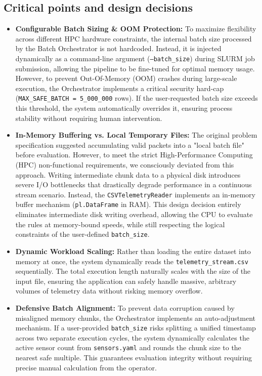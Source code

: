 \documentclass[11pt, a4paper]{article}
\begin{document}
\subsection{Critical points and design decisions}
\begin{itemize}
    \item \textbf{Configurable Batch Sizing \& OOM Protection:} To maximize flexibility across different HPC hardware constraints, the internal batch size processed by the Batch Orchestrator is not hardcoded. Instead, it is injected dynamically as a command-line argument (\texttt{--batch\_size}) during SLURM job submission, allowing the pipeline to be fine-tuned for optimal memory usage. However, to prevent Out-Of-Memory (OOM) crashes during large-scale execution, the Orchestrator implements a critical security hard-cap (\texttt{MAX\_SAFE\_BATCH = 5\_000\_000} rows). If the user-requested batch size exceeds this threshold, the system automatically overrides it, ensuring process stability without requiring human intervention.

    \item \textbf{In-Memory Buffering vs. Local Temporary Files:}
    The original problem specification suggested accumulating valid packets into a "local batch file" before evaluation. However, to meet the strict High-Performance Computing (HPC) non-functional requirements, we consciously deviated from this approach. Writing intermediate chunk data to a physical disk introduces severe I/O bottlenecks that drastically degrade performance in a continuous stream scenario. Instead, the \texttt{CSVTelemetryReader} implements an in-memory buffer mechanism (\texttt{pl.DataFrame} in RAM). This design decision entirely eliminates intermediate disk writing overhead, allowing the CPU to evaluate the rules at memory-bound speeds, while still respecting the logical constraints of the user-defined \texttt{batch\_size}.

    \item \textbf{Dynamic Workload Scaling:} Rather than loading the entire dataset into memory at once, the system dynamically reads the \texttt{telemetry\_stream.csv} sequentially. The total execution length naturally scales with the size of the input file, ensuring the application can safely handle massive, arbitrary volumes of telemetry data without risking memory overflow.

    \item \textbf{Defensive Batch Alignment:} To prevent data corruption caused by misaligned memory chunks, the Orchestrator implements an auto-adjustment mechanism. If a user-provided \texttt{batch\_size} risks splitting a unified timestamp across two separate execution cycles, the system dynamically calculates the active sensor count from \texttt{sensors.yaml} and rounds the chunk size to the nearest safe multiple. This guarantees evaluation integrity without requiring precise manual calculation from the operator.


\end{itemize}
\end{document}
